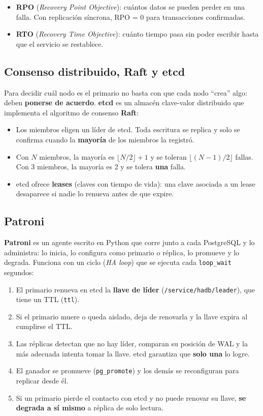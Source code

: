 \documentclass[11pt,a4paper]{article}
\newcommand{\cod}[1]{\texttt{#1}}
\begin{document}
\begin{itemize}
  \item \textbf{RPO} (\emph{Recovery Point Objective}): cuántos datos se pueden perder en una falla. Con replicación síncrona, RPO = 0 para transacciones confirmadas.
  \item \textbf{RTO} (\emph{Recovery Time Objective}): cuánto tiempo pasa sin poder escribir hasta que el servicio se restablece.
\end{itemize}

\subsection{Consenso distribuido, Raft y etcd}

Para decidir cuál nodo es el primario no basta con que cada nodo ``crea'' algo: deben \textbf{ponerse de acuerdo}. \textbf{etcd} es un almacén clave-valor distribuido que implementa el algoritmo de consenso \textbf{Raft}:

\begin{itemize}
  \item Los miembros eligen un líder de etcd. Toda escritura se replica y solo se confirma cuando la \textbf{mayoría} de los miembros la registró.
  \item Con $N$ miembros, la mayoría es $\lfloor N/2 \rfloor + 1$ y se toleran $\lfloor (N-1)/2 \rfloor$ fallas. Con 3 miembros, la mayoría es 2 y se tolera \textbf{una} falla.
  \item etcd ofrece \textbf{leases} (claves con tiempo de vida): una clave asociada a un lease desaparece si nadie lo renueva antes de que expire.
\end{itemize}

\subsection{Patroni}

\textbf{Patroni} es un agente escrito en Python que corre junto a cada PostgreSQL y lo administra: lo inicia, lo configura como primario o réplica, lo promueve y lo degrada. Funciona con un ciclo (\emph{HA loop}) que se ejecuta cada \cod{loop\_wait} segundos:

\begin{enumerate}
  \item El primario renueva en etcd la \textbf{llave de líder} (\cod{/service/hadb/leader}), que tiene un TTL (\cod{ttl}).
  \item Si el primario muere o queda aislado, deja de renovarla y la llave expira al cumplirse el TTL.
  \item Las réplicas detectan que no hay líder, comparan su posición de WAL y la más adecuada intenta tomar la llave. etcd garantiza que \textbf{solo una} lo logre.
  \item El ganador se promueve (\cod{pg\_promote}) y los demás se reconfiguran para replicar desde él.
  \item Si un primario pierde el contacto con etcd y no puede renovar su llave, \textbf{se degrada a sí mismo} a réplica de solo lectura.
\end{enumerate}
\end{document}
